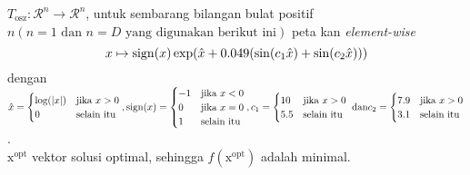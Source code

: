 $T_{\text{osz}}:\mathcal{R}^n\to \mathcal{R}^n$, untuk sembarang bilangan bulat positif $n(n=1 \text{ dan } n=D \text{ yang digunakan berikut ini})$ peta kan \textit{element-wise}\\
\vspace*{-2.5em}
\[x\mapsto \operatorname{sign}(x) \exp(\hat{x}+0.049(\sin(c_1\hat{x})+\sin(c_2\hat{x})))\]
dengan $\hat{x}=\begin{cases}
  \log(\left|x\right|) & \text{jika } x > 0\\
  0 & \text{selain itu}
\end{cases}, \operatorname{sign}(x)=\begin{cases}
  -1 & \text{jika } x < 0\\
  0 & \text{jika } x = 0\\
  1 & \text{selain itu}
\end{cases},c_1=\begin{cases}
  10 & \text{jika } x > 0\\
  5.5 & \text{selain itu}
\end{cases}\text{ dan}\\ c_2=\begin{cases}
  7.9 & \text{jika } x > 0\\
  3.1 & \text{selain itu}
\end{cases}$.\\
$\mathrm{x}^{\text{opt}}$ vektor solusi optimal, sehingga $f(\mathrm{x}^{\text{opt}})$ adalah minimal.

